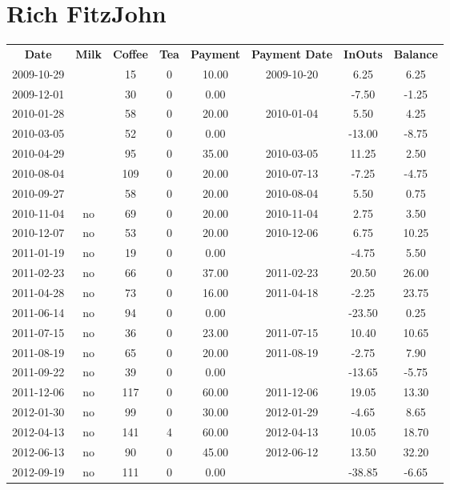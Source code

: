 \section{Rich FitzJohn}

\begin{center}
\begin{tabular}{cccccccc}
\textbf{Date} & \textbf{Milk} & \textbf{Coffee} & \textbf{Tea} & \textbf{Payment} & \textbf{Payment Date} & \textbf{InOuts} & \textbf{Balance} \\
2009-10-29 &  &  15 & 0 & 10.00 & 2009-10-20 &   6.25 &  6.25\\ 
2009-12-01 &  &  30 & 0 &  0.00 &  &  -7.50 & -1.25\\ 
2010-01-28 &  &  58 & 0 & 20.00 & 2010-01-04 &   5.50 &  4.25\\ 
2010-03-05 &  &  52 & 0 &  0.00 &  & -13.00 & -8.75\\ 
2010-04-29 &  &  95 & 0 & 35.00 & 2010-03-05 &  11.25 &  2.50\\ 
2010-08-04 &  & 109 & 0 & 20.00 & 2010-07-13 &  -7.25 & -4.75\\ 
2010-09-27 &  &  58 & 0 & 20.00 & 2010-08-04 &   5.50 &  0.75\\ 
2010-11-04 & no &  69 & 0 & 20.00 & 2010-11-04 &   2.75 &  3.50\\ 
2010-12-07 & no &  53 & 0 & 20.00 & 2010-12-06 &   6.75 & 10.25\\ 
2011-01-19 & no &  19 & 0 &  0.00 &  &  -4.75 &  5.50\\ 
2011-02-23 & no &  66 & 0 & 37.00 & 2011-02-23 &  20.50 & 26.00\\ 
2011-04-28 & no &  73 & 0 & 16.00 & 2011-04-18 &  -2.25 & 23.75\\ 
2011-06-14 & no &  94 & 0 &  0.00 &  & -23.50 &  0.25\\ 
2011-07-15 & no &  36 & 0 & 23.00 & 2011-07-15 &  10.40 & 10.65\\ 
2011-08-19 & no &  65 & 0 & 20.00 & 2011-08-19 &  -2.75 &  7.90\\ 
2011-09-22 & no &  39 & 0 &  0.00 &  & -13.65 & -5.75\\ 
2011-12-06 & no & 117 & 0 & 60.00 & 2011-12-06 &  19.05 & 13.30\\ 
2012-01-30 & no &  99 & 0 & 30.00 & 2012-01-29 &  -4.65 &  8.65\\ 
2012-04-13 & no & 141 & 4 & 60.00 & 2012-04-13 &  10.05 & 18.70\\ 
2012-06-13 & no &  90 & 0 & 45.00 & 2012-06-12 &  13.50 & 32.20\\ 
2012-09-19 & no & 111 & 0 &  0.00 &  & -38.85 & -6.65
\end{tabular}
\end{center}

